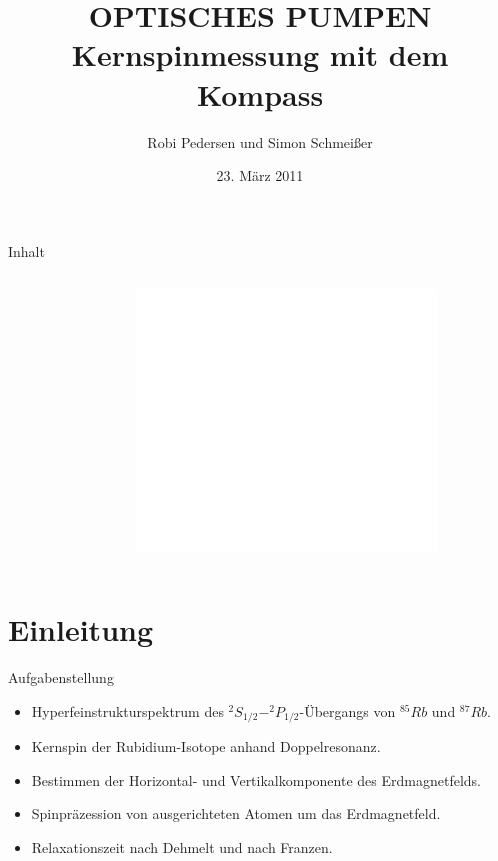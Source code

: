 \documentclass{beamer}
\title[Optisches Pumpen]{OPTISCHES PUMPEN \\ Kernspinmessung mit dem Kompass}
\author{Robi Pedersen und Simon Schmeißer}
\institute{Albert-Ludwigs-Universität Freiburg}
\date{23. März 2011}
\begin{document}
\begin{frame}
\titlepage
\end{frame}

\begin{frame}[t, shrink]{Inhalt}
\begin{columns}
\begin{column}[b]{6cm}
\tableofcontents[sections = {1-4}]
\end{column}
\begin{column}[b]{4cm}
\tableofcontents[sections = {5-7}]
\centering \includegraphics[width = 0.8\textwidth]{Bilder/leer.png}
\end{column}
\end{columns}
\end{frame}


\section{Einleitung}

\begin{frame}{Aufgabenstellung} %
\begin{itemize}
\item Hyperfeinstrukturspektrum des $^2S_{1/2} - ^2P_{1/2}$-Übergangs von $^{85}Rb$ und $^{87}Rb$.
\item Kernspin der Rubidium-Isotope anhand Doppelresonanz.
\item Bestimmen der Horizontal- und Vertikalkomponente des Erdmagnetfelds. 
\item Spinpräzession von ausgerichteten Atomen um das Erdmagnetfeld.
\item Relaxationszeit nach Dehmelt und nach Franzen. 
\end{itemize}
\end{frame}
\end{document}
